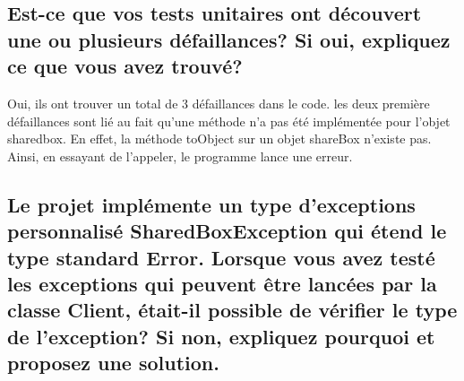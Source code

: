 \documentclass{article}
\begin{document}
\subsection*{Est-ce que vos tests unitaires ont découvert une ou plusieurs défaillances? Si oui,
  expliquez ce que vous avez trouvé?}
Oui, ils ont trouver un total de 3 défaillances dans le code.
les deux première défaillances sont lié au fait qu'une méthode n'a pas été implémentée pour l'objet sharedbox.
En effet, la méthode toObject sur un objet shareBox n'existe pas.
Ainsi, en essayant de l'appeler, le programme lance une erreur.
\subsection*{Le projet implémente un type d’exceptions personnalisé SharedBoxException
  qui étend le type standard Error. Lorsque vous avez testé les exceptions qui
  peuvent être lancées par la classe Client, était-il possible de vérifier le type de
  l’exception? Si non, expliquez pourquoi et proposez une solution.}
\end{document}
